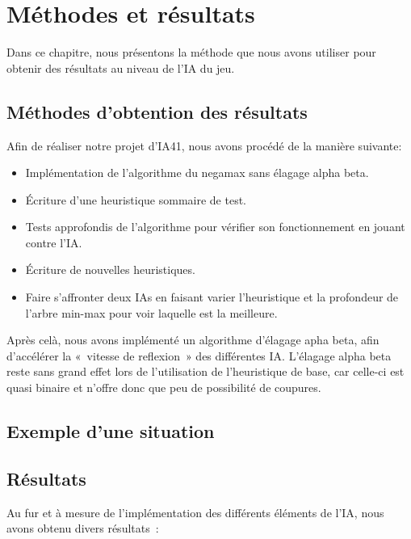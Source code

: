 \chapter{Méthodes et résultats}\label{chapter:methodes-resultats}

Dans ce chapitre, nous présentons la méthode que nous avons utiliser pour obtenir des résultats au niveau de l'IA du jeu.

\section{Méthodes d'obtention des résultats}

Afin de réaliser notre projet d'IA41, nous avons procédé de la manière suivante:

\begin{itemize}
    \item Implémentation de l'algorithme du negamax sans élagage alpha beta.
    \item Écriture d'une heuristique sommaire de test.
    \item Tests approfondis de l'algorithme pour vérifier son fonctionnement en jouant contre l'IA\@.
    \item Écriture de nouvelles heuristiques.
    \item Faire s'affronter deux IAs en faisant varier l'heuristique et la profondeur de l'arbre min-max pour voir laquelle est
        la meilleure.
\end{itemize}

Après celà, nous avons implémenté un algorithme d'élagage apha beta, afin d'accélérer la « vitesse de reflexion » des différentes
IA\@. L'élagage alpha beta reste sans grand effet lors de l'utilisation de l'heuristique de base, car celle-ci est quasi binaire
et n'offre donc que peu de possibilité de coupures.

\section{Exemple d'une situation}


\section{Résultats}

Au fur et à mesure de l'implémentation des différents éléments de l'IA, nous avons obtenu divers résultats :

